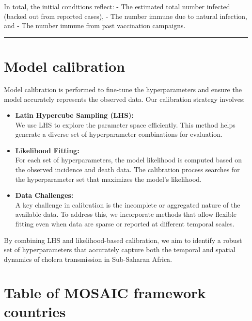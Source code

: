 \documentclass[
]{book}
\begin{document}
In total, the initial conditions reflect:
- The estimated total number infected (backed out from reported cases),
- The number immune due to natural infection, and
- The number immune from past vaccination campaigns.

\begin{center}\rule{0.5\linewidth}{0.5pt}\end{center}

\section{Model calibration}\label{model-calibration}

Model calibration is performed to fine-tune the hyperparameters and ensure the model accurately represents the observed data. Our calibration strategy involves:

\begin{itemize}
\item
  \textbf{Latin Hypercube Sampling (LHS):}\\
  We use LHS to explore the parameter space efficiently. This method helps generate a diverse set of hyperparameter combinations for evaluation.
\item
  \textbf{Likelihood Fitting:}\\
  For each set of hyperparameters, the model likelihood is computed based on the observed incidence and death data. The calibration process searches for the hyperparameter set that maximizes the model's likelihood.
\item
  \textbf{Data Challenges:}\\
  A key challenge in calibration is the incomplete or aggregated nature of the available data. To address this, we incorporate methods that allow flexible fitting even when data are sparse or reported at different temporal scales.
\end{itemize}

By combining LHS and likelihood-based calibration, we aim to identify a robust set of hyperparameters that accurately capture both the temporal and spatial dynamics of cholera transmission in Sub-Saharan Africa.

\label{mosaic-table}

\section{Table of MOSAIC framework countries}\label{table-of-mosaic-framework-countries}
\end{document}
